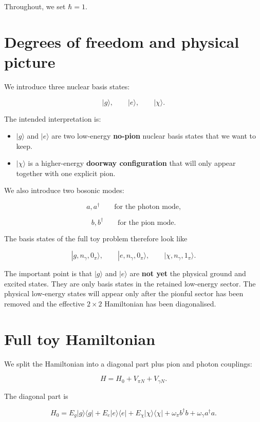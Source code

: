 \documentclass[
]{article}
\renewcommand{\[}{\begin{equation}}
\renewcommand{\]}{\end{equation}}
\providecommand{\tightlist}{%
  \setlength{\itemsep}{0pt}\setlength{\parskip}{0pt}}
\begin{document}
Throughout, we set \(\hbar = 1\).

\section{Degrees of freedom and physical
picture}\label{degrees-of-freedom-and-physical-picture}

We introduce three nuclear basis states:

\[
|g\rangle, \qquad |e\rangle, \qquad |\chi\rangle.
\]

The intended interpretation is:

\begin{itemize}
\tightlist
\item
  \(|g\rangle\) and \(|e\rangle\) are two low-energy \textbf{no-pion}
  nuclear basis states that we want to keep.
\item
  \(|\chi\rangle\) is a higher-energy \textbf{doorway configuration}
  that will only appear together with one explicit pion.
\end{itemize}

We also introduce two bosonic modes:

\[
a, a^\dagger \qquad \text{for the photon mode,}
\]

\[
b, b^\dagger \qquad \text{for the pion mode.}
\]

The basis states of the full toy problem therefore look like

\[
|g,n_\gamma,0_\pi\rangle,\qquad |e,n_\gamma,0_\pi\rangle,\qquad |\chi,n_\gamma,1_\pi\rangle.
\]

The important point is that \(|g\rangle\) and \(|e\rangle\) are
\textbf{not yet} the physical ground and excited states. They are only
basis states in the retained low-energy sector. The physical low-energy
states will appear only after the pionful sector has been removed and
the effective \(2\times 2\) Hamiltonian has been diagonalised.

\section{Full toy Hamiltonian}\label{full-toy-hamiltonian}

We split the Hamiltonian into a diagonal part plus pion and photon
couplings:

\[
H = H_0 + V_{\pi N} + V_{\gamma N}.
\label{eq:Hfullsplit}
\]

The diagonal part is

\[
H_0 =
E_g |g\rangle\langle g|
+
E_e |e\rangle\langle e|
+
E_\chi |\chi\rangle\langle \chi|
+
\omega_\pi b^\dagger b
+
\omega_\gamma a^\dagger a.
\label{eq:H0toy}
\]
\end{document}
